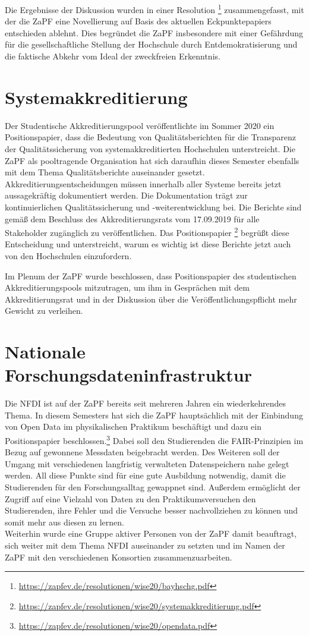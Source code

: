 \documentclass{scrartcl}
\begin{document}
Die Ergebnisse der Diskussion wurden in einer Resolution \footnote{\url{https://zapfev.de/resolutionen/wise20/bayhschg.pdf}} zusammengefasst, mit der die ZaPF eine Novellierung auf Basis des aktuellen Eckpunktepapiers entschieden ablehnt. Dies begründet die ZaPF insbesondere mit einer Gefährdung für die gesellschaftliche Stellung der Hochschule durch Entdemokratisierung und die faktische Abkehr vom Ideal der zweckfreien Erkenntnis.

\section*{Systemakkreditierung}

Der Studentische Akkreditierungspool veröffentlichte im Sommer 2020 ein Positionspapier, dass die Bedeutung von Qualitätsberichten für die Transparenz der Qualitätssicherung von systemakkreditierten Hochschulen unterstreicht. Die ZaPF als pooltragende Organisation hat sich daraufhin dieses Semester ebenfalls mit dem Thema Qualitätsberichte auseinander gesetzt. \\
Akkreditierungsentscheidungen müssen innerhalb aller Systeme bereits jetzt aussagekräftig dokumentiert werden. Die Dokumentation trägt zur kontinuierlichen Qualitätssicherung und -weiterentwicklung bei. Die Berichte sind gemäß dem Beschluss des Akkreditierungsrats vom 17.09.2019 für alle Stakeholder zugänglich zu veröffentlichen. Das Positionspapier \footnote{\url{https://zapfev.de/resolutionen/wise20/systemakkreditierung.pdf}} begrüßt diese Entscheidung und unterstreicht, warum es wichtig ist diese Berichte jetzt auch von den Hochschulen einzufordern.

Im Plenum der ZaPF wurde beschlossen, dass Positionspapier des studentischen Akkreditierungspools mitzutragen, um ihm in Gesprächen mit dem Akkreditierungsrat und in der Diskussion über die Veröffentlichungspflicht mehr Gewicht zu verleihen.

\section*{Nationale Forschungsdateninfrastruktur}

Die NFDI ist auf der ZaPF bereits seit mehreren Jahren ein wiederkehrendes Thema. In diesem Semesters hat sich die ZaPF hauptsächlich mit der Einbindung von Open Data im physikalischen Praktikum beschäftigt und dazu ein Positionspapier beschlossen.\footnote{\url{https://zapfev.de/resolutionen/wise20/opendata.pdf}} Dabei soll den Studierenden die FAIR-Prinzipien im Bezug auf gewonnene Messdaten beigebracht werden. Des Weiteren soll der Umgang mit verschiedenen langfristig verwalteten Datenspeichern nahe gelegt werden. All diese Punkte sind für eine gute Ausbildung notwendig, damit die Studierenden für den Forschungsalltag gewappnet sind. Außerdem ermöglicht der Zugriff auf eine Vielzahl von Daten zu den Praktikumsversuchen den Studierenden, ihre Fehler und die Versuche besser nachvollziehen zu können und somit mehr aus diesen zu lernen.\\
Weiterhin wurde eine Gruppe aktiver Personen von der ZaPF damit beauftragt, sich weiter mit dem Thema NFDI auseinander zu setzten und im Namen der ZaPF mit den verschiedenen Konsortien zusammenzuarbeiten. 
\end{document}
